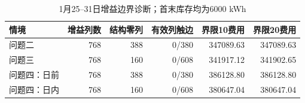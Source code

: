 \begin{table}[H]\centering\small
\caption{1月25--31日增益边界诊断；首末库存均为6000 kWh}
\label{tab:revision-gain}
\begin{tabular}{lrrrrr}\toprule
情境 & 增益列数 & 结构零列 & 有效列触边 & 界限10费用 & 界限20费用\\\midrule
问题二 & 768 & 388 & 0/380 & 347089.63 & 347089.63 \\
问题三 & 768 & 160 & 0/608 & 341917.12 & 341902.65 \\
问题四：日前 & 768 & 388 & 0/380 & 386128.80 & 386128.80 \\
问题四：日内 & 768 & 160 & 0/608 & 380647.04 & 380647.04 \\
\bottomrule\end{tabular}\end{table}
